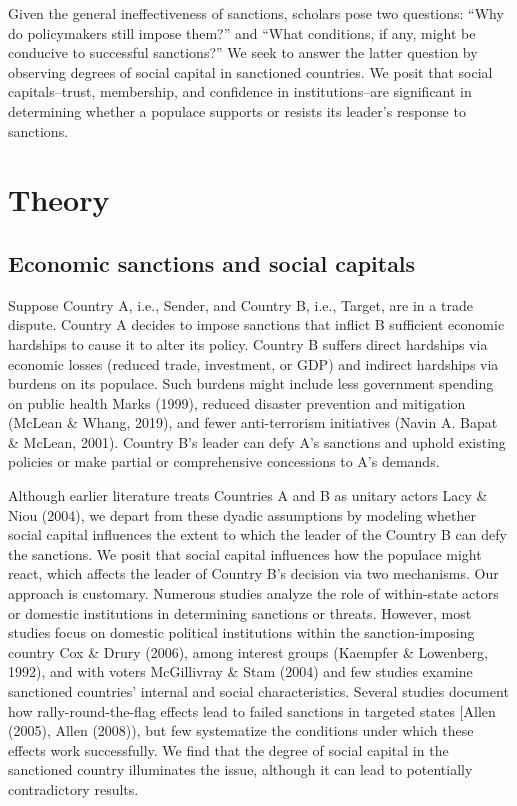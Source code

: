 \documentclass[
  english,
  man]{apa6}
\begin{document}
Given the general ineffectiveness of sanctions, scholars pose two questions: ``Why do policymakers still impose them?'' and ``What conditions, if any, might be conducive to successful sanctions?'' We seek to answer the latter question by observing degrees of social capital in sanctioned countries. We posit that social capitals--trust, membership, and confidence in institutions--are significant in determining whether a populace supports or resists its leader's response to sanctions.

\hypertarget{theory}{%
\section{Theory}\label{theory}}

\hypertarget{economic-sanctions-and-social-capitals}{%
\subsection{Economic sanctions and social capitals}\label{economic-sanctions-and-social-capitals}}

Suppose Country A, i.e., Sender, and Country B, i.e., Target, are in a trade dispute. Country A decides to impose sanctions that inflict B sufficient economic hardships to cause it to alter its policy. Country B suffers direct hardships via economic losses (reduced trade, investment, or GDP) and indirect hardships via burdens on its populace. Such burdens might include less government spending on public health Marks (1999), reduced disaster prevention and mitigation (McLean \& Whang, 2019), and fewer anti-terrorism initiatives (Navin A. Bapat \& McLean, 2001). Country B's leader can defy A's sanctions and uphold existing policies or make partial or comprehensive concessions to A's demands.

Although earlier literature treats Countries A and B as unitary actors Lacy \& Niou (2004), we depart from these dyadic assumptions by modeling whether social capital influences the extent to which the leader of the Country B can defy the sanctions. We posit that social capital influences how the populace might react, which affects the leader of Country B's decision via two mechanisms.
Our approach is customary. Numerous studies analyze the role of within-state actors or domestic institutions in determining sanctions or threats. However, most studies focus on domestic political institutions within the sanction-imposing country Cox \& Drury (2006), among interest groups (Kaempfer \& Lowenberg, 1992), and with voters McGillivray \& Stam (2004) and few studies examine sanctioned countries' internal and social characteristics. Several studies document how rally-round-the-flag effects lead to failed sanctions in targeted states {[}Allen (2005), Allen (2008)), but few systematize the conditions under which these effects work successfully. We find that the degree of social capital in the sanctioned country illuminates the issue, although it can lead to potentially contradictory results.
\end{document}
